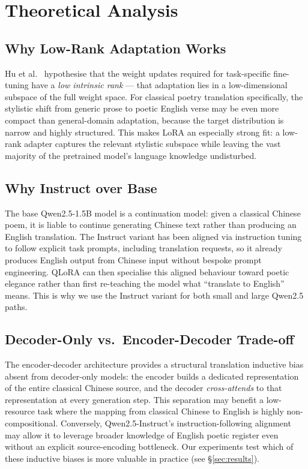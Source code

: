 \section{Theoretical Analysis}

\subsection{Why Low-Rank Adaptation Works}

    Hu et al.~\cite{hu2021lora} hypothesise that the weight updates
    required for task-specific fine-tuning have a \emph{low intrinsic
    rank} --- that adaptation lies in a low-dimensional subspace of the
    full weight space.  For classical poetry translation specifically, the
    stylistic shift from generic prose to poetic English verse may be even
    more compact than general-domain adaptation, because the target
    distribution is narrow and highly structured.  This makes LoRA an
    especially strong fit: a low-rank adapter captures the relevant
    stylistic subspace while leaving the vast majority of the pretrained
    model's language knowledge undisturbed.

\subsection{Why Instruct over Base}

    The base Qwen2.5-1.5B model is a continuation model: given a
    classical Chinese poem, it is liable to continue generating Chinese
    text rather than producing an English translation.  The Instruct
    variant has been aligned via instruction tuning to follow explicit
    task prompts, including translation requests, so it already produces
    English output from Chinese input without bespoke prompt engineering.
    QLoRA can then specialise this aligned behaviour toward poetic
    elegance rather than first re-teaching the model what
    ``translate to English'' means.  This is why we use the Instruct
    variant for both small and large Qwen2.5 paths.

\subsection{Decoder-Only vs.\ Encoder-Decoder Trade-off}

    The encoder-decoder architecture provides a structural translation
    inductive bias absent from decoder-only models: the encoder builds a
    dedicated representation of the entire classical Chinese source, and
    the decoder \emph{cross-attends} to that representation at every
    generation step.  This separation may benefit a low-resource task
    where the mapping from classical Chinese to English is highly
    non-compositional.  Conversely, Qwen2.5-Instruct's
    instruction-following alignment may allow it to leverage broader
    knowledge of English poetic register even without an explicit
    source-encoding bottleneck.  Our experiments test which of these
    inductive biases is more valuable in practice (see \S\ref{sec:results}).



